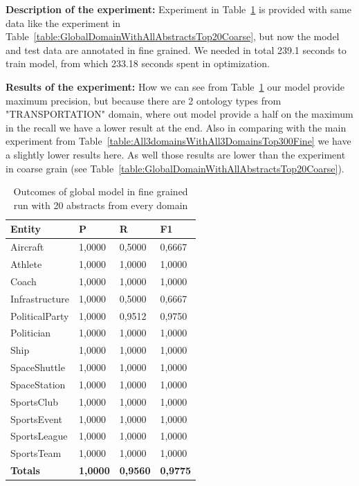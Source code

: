 \documentclass[thesis=M,english]{FITthesis}[2018/05/30]
\begin{document}
\textbf{Description of the experiment:} Experiment in Table~\ref{table:GlobalDomainWithAllAbstractsTop20Fine} is provided with same data like the experiment in Table~\ref{table:GlobalDomainWithAllAbstractsTop20Coarse}, but now the model and test data are annotated in fine grained. We needed in total 239.1 seconds to train model, from which 233.18 seconds spent in optimization.

\textbf{Results of the experiment:} How we can see from Table~\ref{table:GlobalDomainWithAllAbstractsTop20Fine} our model provide maximum precision, but because there are 2 ontology types from "TRANSPORTATION" domain, where out model provide a half on the maximum in the recall we have a lower result at the end. Also in comparing with the main experiment from Table~\ref{table:All3domainsWithAll3DomainsTop300Fine} we have a slightly lower results here. As well those results are lower than the experiment in coarse grain (see Table~\ref{table:GlobalDomainWithAllAbstractsTop20Coarse}).

	\begin{table}[H]\centering
		\begin{tabular}{|l|l|l|l|}
			\hline {\textbf{Entity}} & {\textbf{P}} & {\textbf{R}} & {\textbf{F1}}\\\hline
				Aircraft & 1,0000 & 0,5000 & 0,6667\\
				Athlete & 1,0000 & 1,0000 & 1,0000\\
				Coach & 1,0000 & 1,0000 & 1,0000\\
				Infrastructure & 1,0000 & 0,5000 & 0,6667\\
				PoliticalParty & 1,0000 & 0,9512 & 0,9750\\
				Politician & 1,0000 & 1,0000 & 1,0000\\
				Ship & 1,0000 & 1,0000 & 1,0000\\
				SpaceShuttle & 1,0000 & 1,0000 & 1,0000\\
				SpaceStation & 1,0000 & 1,0000 & 1,0000\\ 
				SportsClub & 1,0000 & 1,0000 & 1,0000\\
				SportsEvent & 1,0000 & 1,0000 & 1,0000\\
				SportsLeague & 1,0000 & 1,0000 & 1,0000\\
				SportsTeam & 1,0000 & 1,0000 & 1,0000\\\hline
				\textbf{Totals} & \textbf{1,0000} & \textbf{0,9560} & \textbf{0,9775}\\\hline
		\end{tabular}
		\caption{Outcomes of global model in fine grained run with 20 abstracts from every domain \label{table:GlobalDomainWithAllAbstractsTop20Fine}}
	\end{table}
\end{document}
